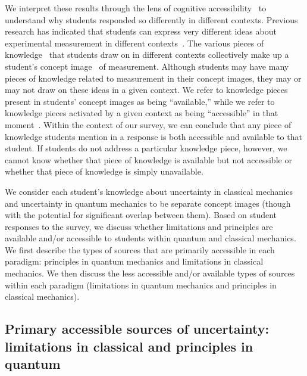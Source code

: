 \documentclass[english,aps,prstper,reprint,showpacs,longbibliography,superscriptaddress,nofootinbib]{revtex4-2}
\begin{document}
We interpret these results through the lens of cognitive accessibility~\cite{Heckler2018} to understand why students responded so differently in different contexts. Previous research has indicated that students can express very different ideas about experimental measurement in different contexts~\cite{Leach2000}. The various pieces of knowledge~\cite{Hammer2000} that students draw on in different contexts collectively make up a student's concept image~\cite{Tall1981,Schermerhorn2021} of measurement. Although students may have many pieces of knowledge related to measurement in their concept images, they may or may not draw on these ideas in a given context. We refer to knowledge pieces present in students' concept images as being ``available,'' while we refer to knowledge pieces activated by a given context as being ``accessible'' in that moment~\cite{Heckler2018}. Within the context of our survey, we can conclude that any piece of knowledge students mention in a response is both accessible and available to that student. If students do not address a particular knowledge piece, however, we cannot know whether that piece of knowledge is available but not accessible or whether that piece of knowledge is simply unavailable.

We consider each student's knowledge about uncertainty in classical mechanics and uncertainty in quantum mechanics to be separate concept images (though with the potential for significant overlap between them). Based on student responses to the survey, we discuss whether limitations and principles are available and/or accessible to students within quantum and classical mechanics. We first describe the types of sources that are primarily accessible in each paradigm: principles in quantum mechanics and limitations in classical mechanics. We then discuss the less accessible and/or available types of sources within each paradigm (limitations in quantum mechanics and principles in classical mechanics).

\subsection{Primary accessible sources of uncertainty: limitations in classical and principles in quantum}
\end{document}
